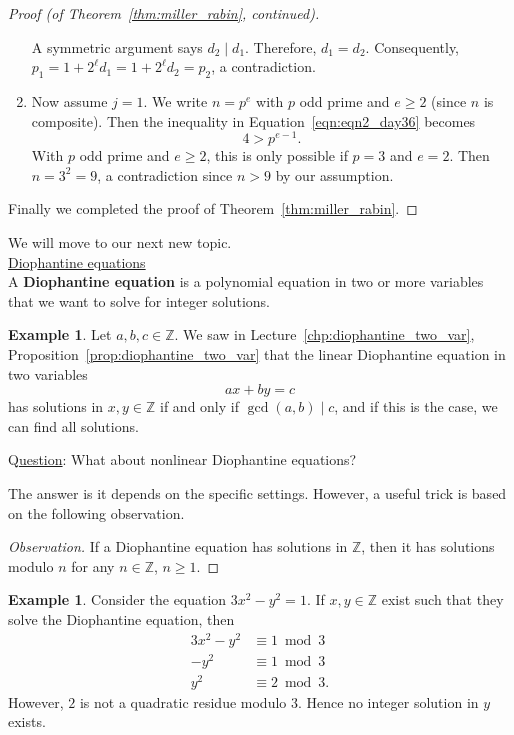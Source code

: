 \documentclass{amsbook}
\theoremstyle{plain}
\theoremstyle{definition}
\newtheorem{example}[theorem]{Example}
\theoremstyle{remark}
\numberwithin{equation}{chapter}
\numberwithin{figure}{chapter}
\newcommand{\Z}{\mathbb{Z}}
\begin{document}
\begin{proof}[Proof {\rm (of Theorem~\ref{thm:miller_rabin}, continued)}]
\begin{enumerate}[label=(\roman*)]
A symmetric argument says $d_2 \mid d_1$. Therefore, $d_1 = d_2$. Consequently, $p_1 = 1 + 2^\ell d_1 = 1 + 2^\ell d_2 = p_2$, a contradiction.
\item Now assume $j = 1$. We write $n = p^e$ with $p$ odd prime and $e \geqslant 2$ (since $n$ is composite). Then the inequality in Equation~\eqref{eqn:eqn2_day36} becomes
  \[
    4 > p^{e - 1}.
  \]
  With $p$ odd prime and $e \geqslant 2$, this is only possible if $p = 3$ and $e = 2$. Then $n = 3^2 = 9$, a contradiction since $n > 9$ by our assumption.
\end{enumerate}
Finally we completed the proof of Theorem~\ref{thm:miller_rabin}.
\end{proof}

We will move to our next new topic.\\

\underline{Dio}p\underline{hantine e}q\underline{uations}\\

A \textbf{Diophantine equation} is a polynomial equation in two or more variables that we want to solve for integer solutions.
\begin{example}
  Let $a, b, c \in \Z$. We saw in Lecture~\ref{chp:diophantine_two_var}, Proposition~\ref{prop:diophantine_two_var} that the linear Diophantine equation in two variables
  \[
    a x + b y = c
  \]
  has solutions in $x, y \in \Z$ if and only if $\gcd (a, b) \mid c$, and if this is the case, we can find all solutions. 
\end{example}

Q\underline{uestion}: What about nonlinear Diophantine equations?

The answer is it depends on the specific settings. However, a useful trick is based on the following observation.
\begin{proof}[Observation]\renewcommand*{\qedsymbol}{}
  If a Diophantine equation has solutions in $\Z$, then it has solutions modulo $n$ for any $n \in \Z$, $n \geqslant 1$.
\end{proof}

\begin{example}
  Consider the equation $3x^2 - y^2 = 1$. If $x, y \in \Z$ exist such that they solve the Diophantine equation, then
  \begin{align}
    3x^2 - y^2 &\equiv 1 \bmod 3 \\
    -y^2  &\equiv 1 \bmod 3 \\
    y^2 &\equiv 2 \bmod 3.
  \end{align}
  However, $2$ is not a quadratic residue modulo $3$. Hence no integer solution in $y$ exists.
\end{example}
\end{document}
